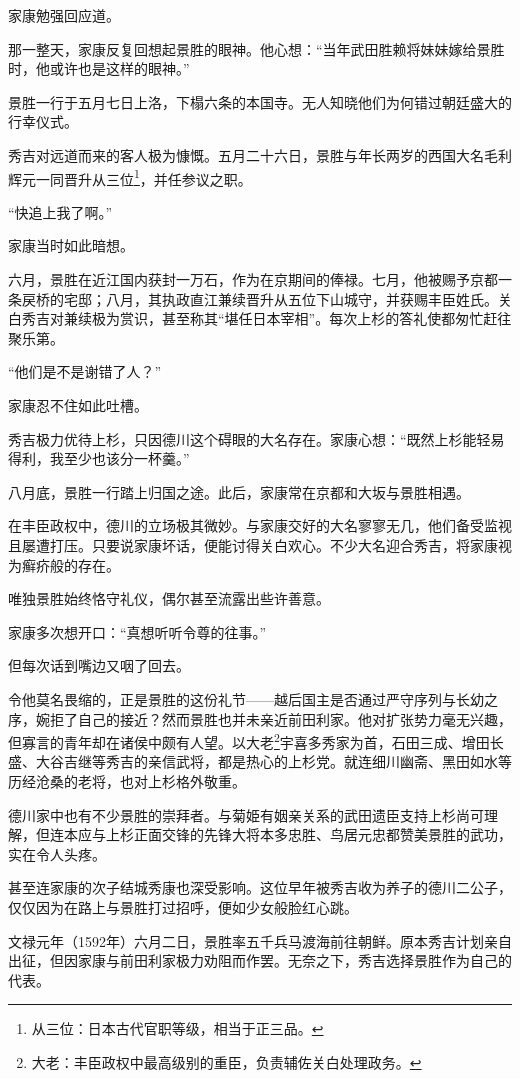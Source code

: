 \documentclass[
]{article}
\begin{document}
家康勉强回应道。

那一整天，家康反复回想起景胜的眼神。他心想：``当年武田胜赖将妹妹嫁给景胜时，他或许也是这样的眼神。''

景胜一行于五月七日上洛，下榻六条的本国寺。无人知晓他们为何错过朝廷盛大的行幸仪式。

秀吉对远道而来的客人极为慷慨。五月二十六日，景胜与年长两岁的西国大名毛利辉元一同晋升从三位\footnote{从三位：日本古代官职等级，相当于正三品。}，并任参议之职。

``快追上我了啊。''

家康当时如此暗想。

六月，景胜在近江国内获封一万石，作为在京期间的俸禄。七月，他被赐予京都一条戻桥的宅邸；八月，其执政直江兼续晋升从五位下山城守，并获赐丰臣姓氏。关白秀吉对兼续极为赏识，甚至称其``堪任日本宰相''。每次上杉的答礼使都匆忙赶往聚乐第。

``他们是不是谢错了人？''

家康忍不住如此吐槽。

秀吉极力优待上杉，只因德川这个碍眼的大名存在。家康心想：``既然上杉能轻易得利，我至少也该分一杯羹。''

八月底，景胜一行踏上归国之途。此后，家康常在京都和大坂与景胜相遇。

在丰臣政权中，德川的立场极其微妙。与家康交好的大名寥寥无几，他们备受监视且屡遭打压。只要说家康坏话，便能讨得关白欢心。不少大名迎合秀吉，将家康视为癣疥般的存在。

唯独景胜始终恪守礼仪，偶尔甚至流露出些许善意。

家康多次想开口：``真想听听令尊的往事。''

但每次话到嘴边又咽了回去。

令他莫名畏缩的，正是景胜的这份礼节------越后国主是否通过严守序列与长幼之序，婉拒了自己的接近？然而景胜也并未亲近前田利家。他对扩张势力毫无兴趣，但寡言的青年却在诸侯中颇有人望。以大老\footnote{大老：丰臣政权中最高级别的重臣，负责辅佐关白处理政务。}宇喜多秀家为首，石田三成、增田长盛、大谷吉继等秀吉的亲信武将，都是热心的上杉党。就连细川幽斋、黑田如水等历经沧桑的老将，也对上杉格外敬重。

德川家中也有不少景胜的崇拜者。与菊姫有姻亲关系的武田遗臣支持上杉尚可理解，但连本应与上杉正面交锋的先锋大将本多忠胜、鸟居元忠都赞美景胜的武功，实在令人头疼。

甚至连家康的次子结城秀康也深受影响。这位早年被秀吉收为养子的德川二公子，仅仅因为在路上与景胜打过招呼，便如少女般脸红心跳。

文禄元年（1592年）六月二日，景胜率五千兵马渡海前往朝鲜。原本秀吉计划亲自出征，但因家康与前田利家极力劝阻而作罢。无奈之下，秀吉选择景胜作为自己的代表。
\end{document}
